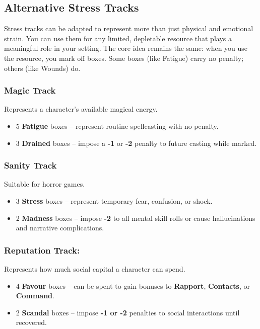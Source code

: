 \subsection{Alternative Stress Tracks}

Stress tracks can be adapted to represent more than just physical and emotional strain. You can use them for any limited, depletable resource that plays a meaningful role in your setting. The core idea remains the same: when you use the resource, you mark off boxes. Some boxes (like Fatigue) carry no penalty; others (like Wounds) do.

\subsubsection{Magic Track}
Represents a character’s available magical energy. 
    \begin{itemize}
        \item 5 \textbf{Fatigue} boxes – represent routine spellcasting with no penalty.
        \item 3 \textbf{Drained} boxes – impose a \textbf{-1} or \textbf{-2} penalty to future casting while marked.
    \end{itemize}

\subsubsection{Sanity Track}
Suitable for horror games. 
    \begin{itemize}
        \item 3 \textbf{Stress} boxes – represent temporary fear, confusion, or shock.
        \item 2 \textbf{Madness} boxes – impose \textbf{-2} to all mental skill rolls or cause hallucinations and narrative complications.
    \end{itemize}

\subsubsection{Reputation Track:} Represents how much social capital a character can spend. 
    \begin{itemize}
        \item 4 \textbf{Favour} boxes – can be spent to gain bonuses to \textbf{Rapport}, \textbf{Contacts}, or \textbf{Command}.
        \item 2 \textbf{Scandal} boxes – impose \textbf{-1 or -2} penalties to social interactions until recovered.
    \end{itemize}

